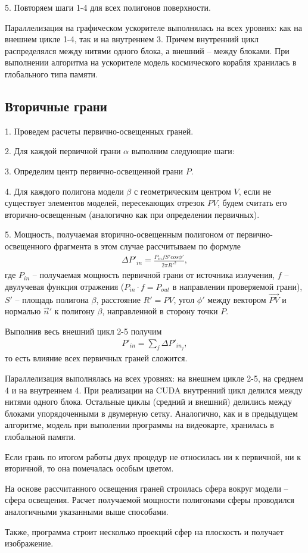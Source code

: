 5. Повторяем шаги 1-4 для всех полигонов поверхности.

Параллелизация на графическом ускорителе выполнялась на всех уровнях: как на внешнем цикле 1-4, так и на внутреннем 3. Причем внутренний цикл распределялся между нитями одного блока, а внешний -- между блоками. При выполнении алгоритма на ускорителе модель космического корабля хранилась в глобального типа памяти. 

\subsection*{Вторичные грани}

1. Проведем расчеты первично-освещенных граней.

2. Для каждой первичной грани $\alpha$ выполним следующие шаги:

3. Определим центр первично-освещенной грани $P$.

4. Для каждого полигона модели $\beta$ с геометрическим центром $V$, если не существует элементов моделей, пересекающих отрезок $PV$, будем считать его вторично-освещенным (аналогично как при определении первичных).

5. Мощность, получаемая вторично-освещенным полигоном от первично-освещенного фрагмента в этом случае рассчитываем по формуле
\begin{gather}
  \Delta P'_{in} = \frac{P_{in} f S' cos\phi'}{2 \pi R'^2},
\end{gather}
где $ P_{in} $ -- получаемая мощность первичной грани от источника излучения, $ f $ -- двулучевая функция отражения ($ P_{in} \cdot f = P_{out} $ в направлении проверяемой грани), $ S' $ -- площадь полигона $ \beta $, расстояние $R' = PV$, угол $\phi'$ между вектором $\vec {PV}$ и нормалью $\vec n'$ к полигону $\beta$, направленной в сторону точки $P$.

Выполнив весь внешний цикл 2-5 получим 
\begin{gather}
  P'_{in} = \sum_j \Delta P'_{in_j},
\end{gather}
то есть влияние всех первичных граней сложится.

Параллелизация выполнялась на всех уровнях: на внешнем цикле 2-5, на среднем 4 и на внутреннем 4. При реализации на CUDA внутренний цикл делился между нитями одного блока. Остальные циклы (средний и внешний) делились между блоками упорядоченными в двумерную сетку. Аналогично, как и в предыдущем алгоритме, модель при выполении программы на видеокарте, хранилась в глобальной памяти. 

Если грань по итогом работы двух процедур не относилась ни к первичной, ни к вторичной, то она помечалась особым цветом. 

На основе рассчитанного освещения граней строилась сфера вокруг модели -- сфера освещения. Расчет получаемой мощности полигонами сферы проводился аналогичными указанными выше способами. 

Также, программа строит несколько проекций сфер на плоскость и получает изображение.
